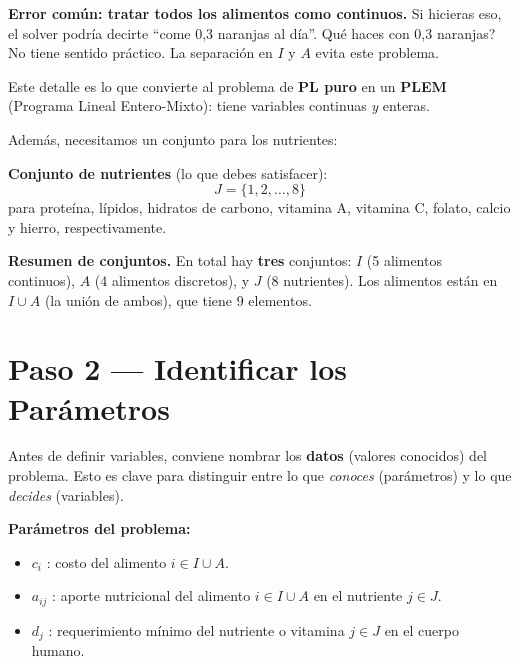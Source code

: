 \documentclass[12pt]{article}
\begin{document}
\begin{cajaroja}
\textbf{Error com\'un: tratar todos los alimentos como continuos.} Si hicieras eso, el solver podr\'ia decirte ``come 0,3 naranjas al d\'ia''. \textquestiondown Qu\'e haces con 0,3 naranjas? No tiene sentido pr\'actico. La separaci\'on en $I$ y $A$ evita este problema.

Este detalle es lo que convierte al problema de \textbf{PL puro} en un \textbf{PLEM} (Programa Lineal Entero-Mixto): tiene variables continuas \textit{y} enteras.
\end{cajaroja}

Adem\'as, necesitamos un conjunto para los nutrientes:

\begin{cajazul}
\textbf{Conjunto de nutrientes} (lo que debes satisfacer):
\[
    J = \{1, 2, \ldots, 8\}
\]
para prote\'ina, l\'ipidos, hidratos de carbono, vitamina A, vitamina C, folato, calcio y hierro, respectivamente.
\end{cajazul}

\begin{cajanota}
\textbf{Resumen de conjuntos.} En total hay \textbf{tres} conjuntos: $I$ (5 alimentos continuos), $A$ (4 alimentos discretos), y $J$ (8 nutrientes). Los alimentos est\'an en $I \cup A$ (la uni\'on de ambos), que tiene 9 elementos.
\end{cajanota}

\section{Paso 2 --- Identificar los Par\'ametros}

Antes de definir variables, conviene nombrar los \textbf{datos} (valores conocidos) del problema. Esto es clave para distinguir entre lo que \textit{conoces} (par\'ametros) y lo que \textit{decides} (variables).

\begin{cajazul}
\textbf{Par\'ametros del problema:}
\begin{itemize}
    \item $c_i$ : costo del alimento $i \in I \cup A$.
    \item $a_{ij}$ : aporte nutricional del alimento $i \in I \cup A$ en el nutriente $j \in J$.
    \item $d_j$ : requerimiento m\'inimo del nutriente o vitamina $j \in J$ en el cuerpo humano.
\end{itemize}
\end{cajazul}
\end{document}

